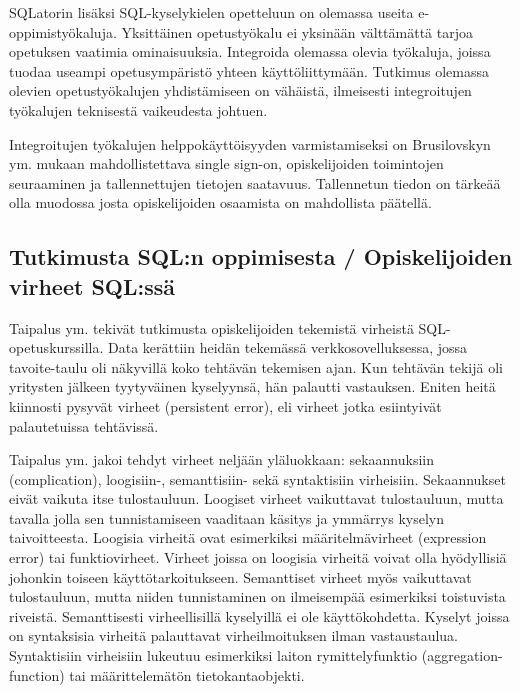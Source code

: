\documentclass[finnish,twoside,openright]{HYgraduMLDS}
\begin{document}

SQLatorin lisäksi SQL-kyselykielen opetteluun on olemassa useita e-oppimistyökaluja. Yksittäinen opetustyökalu ei yksinään välttämättä tarjoa opetuksen vaatimia ominaisuuksia. Integroida olemassa olevia työkaluja, joissa tuodaa useampi opetusympäristö yhteen käyttöliittymään. Tutkimus olemassa olevien opetustyökalujen yhdistämiseen on vähäistä, ilmeisesti integroitujen työkalujen teknisestä vaikeudesta johtuen\cite{Brusilovsky:2010:LSP:1656255.1656257}.

Integroitujen työkalujen helppokäyttöisyyden varmistamiseksi on Brusilovskyn ym. \cite{Brusilovsky:2010:LSP:1656255.1656257} mukaan mahdollistettava single sign-on, opiskelijoiden toimintojen seuraaminen ja tallennettujen tietojen saatavuus. Tallennetun tiedon on tärkeää olla muodossa josta opiskelijoiden osaamista on mahdollista päätellä.


\subsection{Tutkimusta SQL:n oppimisesta / Opiskelijoiden virheet SQL:ssä}

Taipalus ym. \cite{Taipalus:2019:EFS:3287324.3287359} tekivät tutkimusta opiskelijoiden tekemistä virheistä SQL-opetuskurssilla. Data kerättiin heidän tekemässä verkkosovelluksessa, jossa tavoite-taulu oli näkyvillä koko tehtävän tekemisen ajan. Kun tehtävän tekijä oli yritysten jälkeen tyytyväinen kyselyynsä, hän palautti vastauksen. Eniten heitä kiinnosti pysyvät virheet (persistent error), eli virheet jotka esiintyivät palautetuissa tehtävissä. 

Taipalus ym. \cite{Taipalus:2019:EFS:3287324.3287359} jakoi tehdyt virheet neljään yläluokkaan: sekaannuksiin (complication), loogisiin-, semanttisiin- sekä syntaktisiin virheisiin. Sekaannukset eivät vaikuta itse tulostauluun. %
Loogiset virheet vaikuttavat tulostauluun, mutta tavalla jolla sen tunnistamiseen vaaditaan käsitys ja ymmärrys kyselyn taivoitteesta. Loogisia virheitä ovat esimerkiksi määritelmävirheet (expression error) tai funktiovirheet. Virheet joissa on loogisia virheitä voivat olla hyödyllisiä johonkin toiseen käyttötarkoitukseen. Semanttiset virheet myös vaikuttavat tulostauluun, mutta niiden tunnistaminen on ilmeisempää esimerkiksi toistuvista riveistä. Semanttisesti virheellisillä kyselyillä ei ole käyttökohdetta. Kyselyt joissa on syntaksisia virheitä palauttavat virheilmoituksen ilman vastaustaulua. Syntaktisiin virheisiin lukeutuu esimerkiksi laiton rymittelyfunktio (aggregation-function) tai määrittelemätön tietokantaobjekti.
\end{document}
